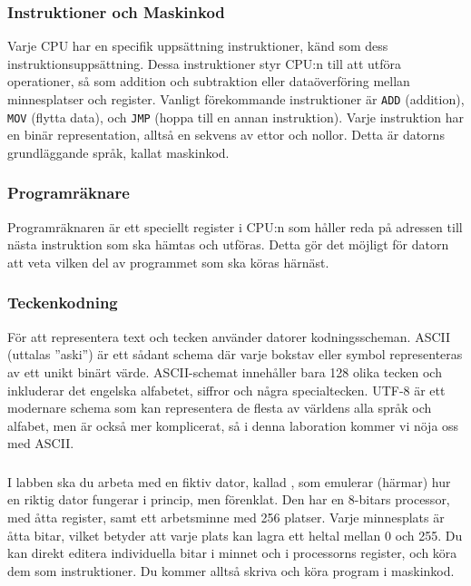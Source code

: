 \subsubsection{Instruktioner och Maskinkod}
Varje CPU har en specifik uppsättning instruktioner, känd som dess instruktionsuppsättning. Dessa instruktioner styr CPU:n till att utföra operationer, så som addition och subtraktion eller dataöverföring mellan minnesplatser och register. Vanligt förekommande instruktioner är \texttt{ADD} (addition), \texttt{MOV} (flytta data), och \texttt{JMP} (hoppa till en annan instruktion). Varje instruktion har en binär representation, alltså en sekvens av ettor och nollor. Detta är datorns grundläggande språk, kallat maskinkod.

\subsubsection{Programräknare}
Programräknaren är ett speciellt register i CPU:n som håller reda på adressen till nästa instruktion som ska hämtas och utföras. Detta gör det möjligt för datorn att veta vilken del av programmet som ska köras härnäst.

\subsubsection{Teckenkodning}
För att representera text och tecken använder datorer kodningsscheman. ASCII (uttalas ''aski'') är ett sådant schema där varje bokstav eller symbol representeras av ett unikt binärt värde. ASCII-schemat innehåller bara 128 olika tecken och inkluderar det engelska alfabetet, siffror och några specialtecken. UTF-8 är ett modernare schema som kan representera de flesta av världens alla språk och alfabet, men är också mer komplicerat, så i denna laboration kommer vi nöja oss med ASCII.

\subsubsection{\CPUprogname}
I labben ska du arbeta med en fiktiv dator, kallad \CPUprogname, som emulerar (härmar) hur en riktig dator fungerar i princip, men förenklat.
Den har en 8-bitars processor, med åtta register, samt ett arbetsminne med 256 platser. Varje minnesplats är åtta bitar, vilket betyder att varje plats kan lagra ett heltal mellan 0 och 255.
Du kan direkt editera individuella bitar i minnet och i processorns register, och köra dem som instruktioner. Du kommer alltså skriva och köra program i maskinkod.

